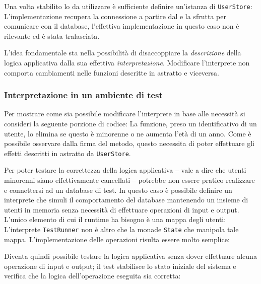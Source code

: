 Una volta stabilito lo  da utilizzare è sufficiente definire un'istanza di \lstinline{UserStore}:
L'implementazione recupera la connessione a partire dal  e la sfrutta per comunicare con il database, l'effettiva implementazione in questo caso non è rilevante ed è stata tralasciata.

L'idea fondamentale sta nella possibilità di disaccoppiare la \emph{descrizione} della logica applicativa dalla sua effettiva \emph{interpretazione}. Modificare l'interprete non comporta cambiamenti nelle funzioni descritte in astratto e viceversa.

\subsubsection{Interpretazione in un ambiente di test}
Per mostrare come sia possibile modificare l'interprete in base alle necessità si consideri la seguente porzione di codice:
La funzione, preso un identificativo di un utente, lo elimina se questo è minorenne o ne aumenta l'età di un anno. Come è possibile osservare dalla firma del metodo, questo necessita di poter effettuare gli effetti descritti in astratto da \lstinline{UserStore}.

Per poter testare la correttezza della logica applicativa -- vale a dire che utenti minorenni siano effettivamente cancellati -- potrebbe non essere pratico realizzare e connettersi ad un database di test. In questo caso è possibile definire un interprete che simuli il comportamento del database mantenendo un insieme di utenti in memoria senza necessità di effettuare operazioni di input e output. L'unico elemento di cui il runtime ha bisogno è una mappa degli utenti:
L'interprete \lstinline{TestRunner} non è altro che la monade \lstinline{State} che manipola tale mappa. L'implementazione delle operazioni risulta essere molto semplice:

Diventa quindi possibile testare la logica applicativa senza dover effettuare alcuna operazione di input e output; il test stabilisce lo stato iniziale del sistema e verifica che la logica dell'operazione eseguita sia corretta:
